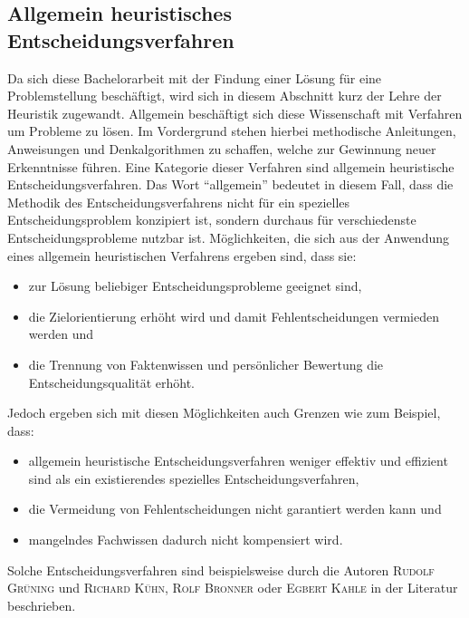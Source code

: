 \subsection{Allgemein heuristisches Entscheidungsverfahren}
Da sich diese Bachelorarbeit mit der Findung einer Lösung für eine Problemstellung beschäftigt, wird sich in diesem Abschnitt kurz der Lehre der Heuristik zugewandt. Allgemein beschäftigt sich diese Wissenschaft mit Verfahren um Probleme zu lösen. Im Vordergrund stehen hierbei methodische Anleitungen, Anweisungen und Denkalgorithmen zu schaffen, welche zur Gewinnung neuer Erkenntnisse führen. \cite{Duden.10.02.2022} \linebreak Eine Kategorie dieser Verfahren sind allgemein heuristische Entscheidungsverfahren. Das Wort "`allgemein"' bedeutet in diesem Fall, dass die Methodik des Entscheidungsverfahrens nicht für ein spezielles Entscheidungsproblem konzipiert ist, sondern durchaus für verschiedenste Entscheidungsprobleme nutzbar ist. 
Möglichkeiten, die sich aus der Anwendung eines allgemein heuristischen Verfahrens ergeben sind, dass sie:
\begin{itemize}
	\item zur Lösung beliebiger Entscheidungsprobleme geeignet sind,
	\item die Zielorientierung erhöht wird und damit Fehlentscheidungen vermieden werden und
	\item die Trennung von Faktenwissen und persönlicher Bewertung die Entscheidungsqualität erhöht.
\end{itemize}
Jedoch ergeben sich mit diesen Möglichkeiten auch Grenzen wie zum Beispiel, dass:
\begin{itemize}
	\item allgemein heuristische Entscheidungsverfahren weniger effektiv und effizient sind als ein existierendes spezielles Entscheidungsverfahren,
	\item die Vermeidung von Fehlentscheidungen nicht garantiert werden kann und
	\item mangelndes Fachwissen dadurch nicht kompensiert wird.
\end{itemize}
Solche Entscheidungsverfahren sind beispielsweise durch die Autoren \textsc{Rudolf Grüning} und \textsc{Richard Kühn}, \textsc{Rolf Bronner} oder \textsc{Egbert Kahle} in der Literatur beschrieben.

%
%
%
%
%
